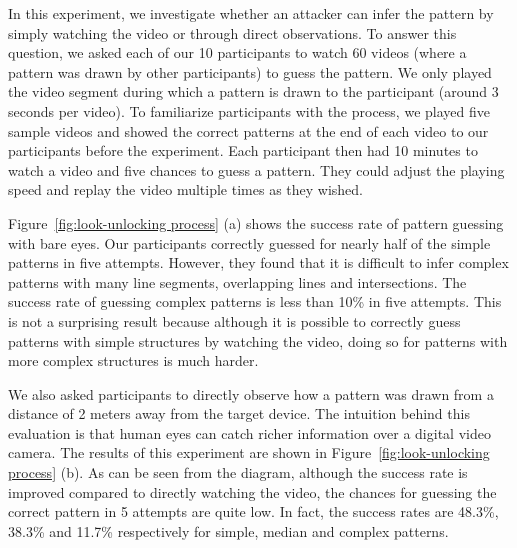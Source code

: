    In this experiment, we investigate whether an attacker can infer the pattern by
   simply watching the video or through direct observations. To answer this question, we asked each of our 10 participants to watch 60 videos (where
   a pattern was drawn by other participants) to guess the pattern.  We
    only played the video segment during which a pattern is drawn to the participant (around 3 seconds per video).
   To familiarize participants with the process, we
    played  five sample videos and showed the correct patterns at the end of each video to our participants before the experiment.
   Each participant then had 10 minutes to watch a video and five chances to guess a pattern. They could adjust the playing speed and
   replay the video multiple times as they wished.


        Figure~\ref{fig:look-unlocking process} (a) shows the success rate of pattern guessing with
        bare eyes. Our participants correctly guessed for nearly half of the
        simple patterns in five attempts. However, they found that it is difficult
        to infer complex patterns with many line segments, overlapping lines and intersections.
        The success rate of guessing complex patterns is less than 10\% in five attempts.
        This is not a surprising result
        because although it is possible to correctly guess patterns with
        simple structures by watching the video, doing so for patterns with
        more complex structures is much harder.


    We also asked participants to directly observe how a pattern was drawn
    from a distance of 2 meters away from the target device. The intuition
    behind this evaluation is that human eyes can catch richer information
    over a digital video camera. The results of this experiment are shown in
    Figure~\ref{fig:look-unlocking process} (b).  As can be seen from the
    diagram, although the success rate is improved compared to directly watching the video, the chances for guessing the correct pattern in
    5 attempts are quite low. In
    fact, the success rates are 48.3\%, 38.3\%
    and 11.7\% respectively for simple, median and complex patterns.

